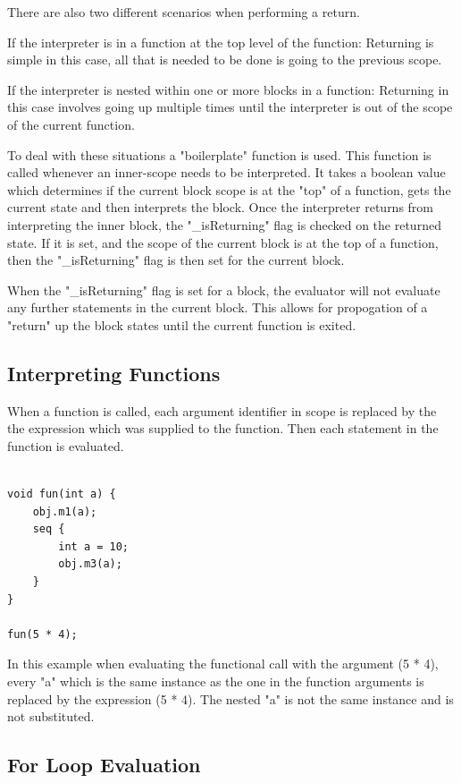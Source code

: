 There are also two different scenarios when performing a return.

If the interpreter is in a function at the top level of the function:
Returning is simple in this case, all that is needed to be done is
going to the previous scope.

If the interpreter is nested within one or more blocks in a function:
Returning in this case involves going up multiple times until the interpreter
is out of the scope of the current function.

To deal with these situations a "boilerplate" function is used. This function
is called whenever an inner-scope needs to be interpreted. It
takes a boolean value which determines if the current block scope is at
the "top" of a function, gets the current state and then interprets the block.
Once the interpreter returns from interpreting the inner block, the "\_isReturning"
flag is checked on the returned state. If it is set, and the scope
of the current block is at the top of a function, then the "\_isReturning" flag
is then set for the current block.
 
When the "\_isReturning" flag is set for a block, the evaluator will not evaluate
any further statements in the current block. This allows for propogation of a "return"
up the block states until the current function is exited.


\subsection{Interpreting Functions}
When a function is called, each argument identifier in scope
is replaced by the the expression which was supplied to the function.
Then each statement in the function is evaluated.

\begin{lstlisting}[style=myGPC]

void fun(int a) {
    obj.m1(a);
    seq {
        int a = 10;
        obj.m3(a);
    }    
}

fun(5 * 4);

\end{lstlisting}

In this example when evaluating the functional call with the argument (5 * 4),
every "a" which is the same instance as the one in the function arguments
is replaced by the expression (5 * 4). The nested "a" is not the same
instance and is not substituted.


\subsection{For Loop Evaluation}

